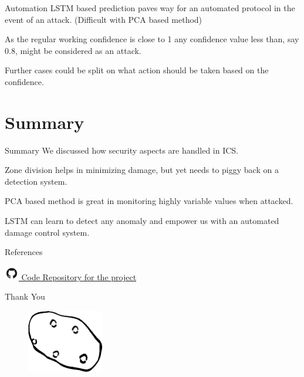 \documentclass[10pt]{beamer}
\newcommand*{\github}{\includegraphics[width=1.7em]{github}}
\begin{document}
\begin{frame}{Automation}
	LSTM based prediction paves way for an automated protocol in the event of an attack. (Difficult with PCA based method)
    
    As the regular working confidence is close to 1 any confidence value less than, say 0.8, might be considered as an attack.
    
    Further cases could be split on what action should be taken based on the confidence.
\end{frame}

\section{Summary}

\begin{frame}{Summary}
	We discussed how security aspects are handled in ICS.
    
    Zone division helps in minimizing damage, but yet needs to piggy back on a detection system.
    
    PCA based method is great in monitoring highly variable values when attacked.
    
    LSTM can learn to detect any anomaly and empower us with an automated damage control system.
  
\end{frame}

\begin{frame}{References}

  
  
  \github \href{https://github.com/manikantareddyd/ics-attack-detection}{  Code Repository for the project}
\end{frame}



\begin{frame}{ }
	\begin{center}
		\LARGE{Thank You}
	\end{center}
    \begin{figure}
    	\centering
    	\includegraphics[width=0.3\textwidth]{potato.eps}
    \end{figure}
   
\end{frame}
\end{document}
